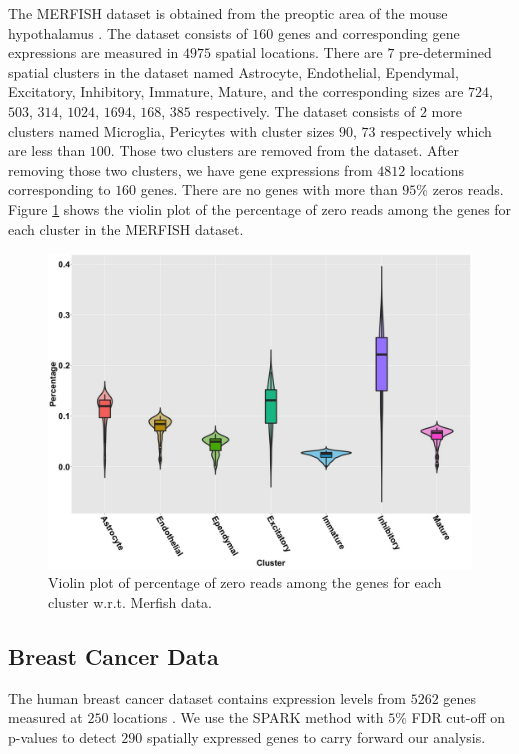 \documentclass[
]{book}
\begin{document}
The MERFISH dataset is obtained from the preoptic area of the mouse hypothalamus \citep{Moffitteaau5324}. The dataset consists of \(160\) genes and corresponding gene expressions are measured in \(4975\) spatial locations. There are \(7\) pre-determined spatial clusters in the dataset named Astrocyte, Endothelial, Ependymal, Excitatory, Inhibitory, Immature, Mature, and the corresponding sizes are \(724\), \(503\), \(314\), \(1024\), \(1694\), \(168\), \(385\) respectively. The dataset consists of \(2\) more clusters named Microglia, Pericytes with cluster sizes \(90\), \(73\) respectively which are less than \(100\). Those two clusters are removed from the dataset. After removing those two clusters, we have gene expressions from \(4812\) locations corresponding to \(160\) genes. There are no genes with more than \(95\%\) zeros reads. Figure \ref{fig:zeroperMF} shows the violin plot of the percentage of zero reads among the genes for each cluster in the MERFISH dataset.

\begin{figure}

{\centering \includegraphics[width=0.8\linewidth]{images/Zero_percentage_violin} 

}

\caption{Violin plot of percentage of zero reads among the genes for each cluster w.r.t. Merfish data.}\label{fig:zeroperMF}
\end{figure}

\hypertarget{breast-cancer-data}{%
\subsection{Breast Cancer Data}\label{breast-cancer-data}}

The human breast cancer dataset contains expression levels from \(5262\) genes measured at \(250\) locations \citep{staahl2016visualization}. We use the SPARK method with \(5\%\) FDR cut-off on p-values to detect \(290\) spatially expressed genes to carry forward our analysis.
\end{document}
